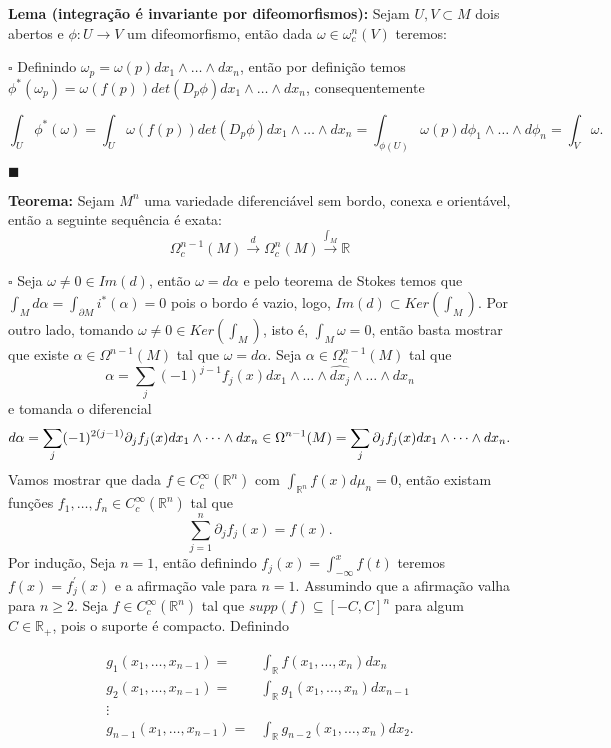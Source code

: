 \documentclass{article}
\begin{document}
	\vspace{2 mm}
	\textbf{Lema (integração é invariante por difeomorfismos):} Sejam $U,V \subset M$ dois abertos e $\phi : U \to V $ um difeomorfismo, então dada $\omega \in \omega^{n}_{c}(V)$ teremos:
	
	$\square$ Definindo $\omega_{p} = \omega(p) dx_{1} \wedge \dots \wedge dx_{n}$, então por definição temos $\phi^{*}(\omega_{p}) = \omega(f(p))det(D_{p}\phi) dx_{1} \wedge \dots \wedge dx_{n}$, consequentemente
	
	$$
	\int_{U} \phi^{*}(\omega) = \int_{U} \omega(f(p))det(D_{p}\phi) dx_{1} \wedge \dots \wedge dx_{n} = \int_{\phi(U)}\omega(p) d\phi_{1} \wedge \dots \wedge d\phi_{n} = \int_{V} \omega.
	$$
	
	$\blacksquare$
	
	\vspace{2 mm}
	\textbf{Teorema:} Sejam $M^{n}$ uma variedade diferenciável sem bordo, conexa e orientável, então a seguinte sequência é exata:
	$$
	\Omega^{n-1}_{c}(M) \xrightarrow{d} \Omega^{n}_{c}(M) \xrightarrow{\int_{M}} \mathbb{R}
	$$
	
	$\square$ Seja $\omega \neq 0 \in Im(d)$, então $\omega = d\alpha $ e pelo teorema de Stokes temos que $\int_{M} d\alpha = \int_{\partial M} i^{*}(\alpha) = 0$ pois o bordo é vazio, logo, $Im(d) \subset Ker(\int_{M})$. Por outro lado, tomando $\omega \neq 0 \in Ker(\int_{M})$, isto é, $\int_{M} \omega = 0$, então basta mostrar que existe $\alpha \in \Omega^{n-1}(M)$ tal que $\omega = d\alpha$. Seja $\alpha \in \Omega_{c}^{n-1}(M)$ tal que
	$$
	\alpha = \sum_{j} (-1)^{j-1}f_{j}(x) dx_{1} \wedge \dots \wedge \hat{dx_{j}} \wedge \dots \wedge dx_{n}
	$$	
	e tomanda o diferencial
	$$
	d\alpha = \sum_{j} (-1)^{2(j-1)}\partial_{j}f_{j}(x) dx_{1} \wedge \dots \wedge dx_{n}\in \Omega^{n-1}(M)
	\\
	= \sum_{j} \partial_{j}f_{j}(x) dx_{1} \wedge \dots \wedge dx_{n}.
	$$
	Vamos mostrar que dada $f \in C^{\infty}_{c}(\mathbb{R}^{n})$ com $\int_{\mathbb{R}^{n}} f(x)d\mu_{n} = 0$, então existam funções $f_{1}, \dots, f_{n} \in C^{\infty}_{c}(\mathbb{R}^{n})$ tal que 
	$$
	\sum_{j=1}^{n} \partial_{j}f_{j}(x) = f(x).
	$$
	Por indução, Seja $n=1$, então definindo $f_{j}(x) = \int_{-\infty}^{x}f(t)$ teremos $f(x) = f^{'}_{j}(x)$ e a afirmação vale para $n=1$. Assumindo que a afirmação valha para $n \geq 2$. Seja $f \in C^{\infty}_{c}(\mathbb{R}^{n})$ tal que $supp(f) \subseteq [-C, C]^{n}$ para algum $C \in \mathbb{R}_{+}$, pois o suporte é compacto. Definindo 
	
	$$
	\begin{aligned}
	g_{1}(x_{1}, \dots, x_{n-1}) 
	=& \int_{\mathbb{R}} f(x_{1}, \dots, x_{n})dx_{n}
	\\
	g_{2}(x_{1}, \dots, x_{n-1}) 
	=& \int_{\mathbb{R}} g_{1}(x_{1}, \dots, x_{n})dx_{n-1}
	\\
	\vdots &
	\\
	g_{n-1}(x_{1}, \dots, x_{n-1})
	=& \int_{\mathbb{R}} g_{n-2}(x_{1}, \dots, x_{n})dx_{2}.
	\end{aligned}
	$$
	
\end{document}
